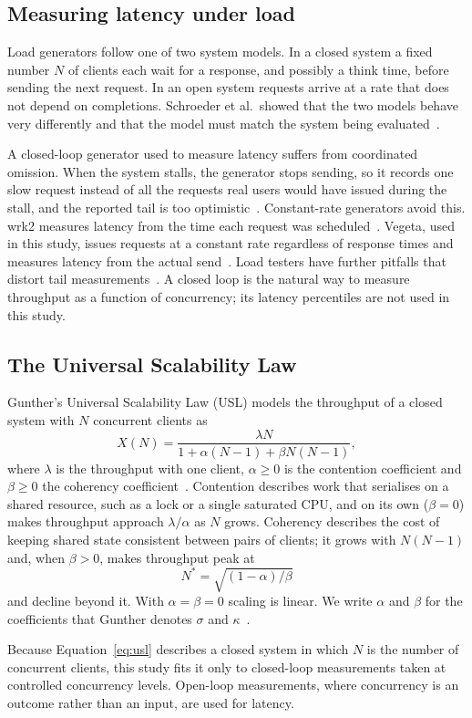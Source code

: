 \subsection{Measuring latency under load}
\label{sec:bg-load}

Load generators follow one of two system models. In a closed system a fixed number $N$ of clients
each wait for a response, and possibly a think time, before sending the next request. In an open
system requests arrive at a rate that does not depend on completions. Schroeder et al.\
showed that the two models behave very differently and that the model must match the system being
evaluated~\cite{Schroeder2006}.

A closed-loop generator used to measure latency suffers from coordinated omission. When the system
stalls, the generator stops sending, so it records one slow request instead of all the requests real users would
have issued during the stall, and the reported tail is too optimistic~\cite{Tene2015}. Constant-rate generators avoid this. wrk2 measures latency from the time each request was
scheduled~\cite{wrk2}. Vegeta, used in this study, issues requests at a constant rate regardless of response
times and measures latency from the actual send~\cite{Vegeta}. Load testers have further pitfalls that distort
tail measurements~\cite{Zhang2016Treadmill,Kogias2019}. A closed loop is the natural way to measure throughput as
a function of concurrency; its latency percentiles are not used in this study.

\subsection{The Universal Scalability Law}
\label{sec:bg-usl}

Gunther's Universal Scalability Law (USL) models the throughput of a closed system with $N$
concurrent clients as
\begin{equation}
  X(N) = \frac{\lambda N}{1 + \alpha (N-1) + \beta N (N-1)},
  \label{eq:usl}
\end{equation}
where $\lambda$ is the throughput with one client, $\alpha \ge 0$ is the contention coefficient and
$\beta \ge 0$ the coherency coefficient~\cite{Gunther2007}. Contention describes work that
serialises on a shared resource, such as a lock or a single saturated CPU, and on its own
($\beta = 0$) makes throughput approach $\lambda/\alpha$ as $N$ grows. Coherency describes the cost
of keeping shared state consistent between pairs of clients; it grows with $N(N-1)$ and, when
$\beta > 0$, makes throughput peak at
\begin{equation}
  N^{*} = \sqrt{(1-\alpha)/\beta}
  \label{eq:nstar}
\end{equation}
and decline beyond it. With $\alpha = \beta = 0$ scaling is linear. We write $\alpha$ and $\beta$
for the coefficients that Gunther denotes $\sigma$ and $\kappa$~\cite{Gunther2007}.

Because Equation~\eqref{eq:usl}
describes a closed system in which $N$ is the number of concurrent clients, this study fits it only
to closed-loop measurements taken at controlled concurrency levels. Open-loop measurements, where
concurrency is an outcome rather than an input, are used for latency.
